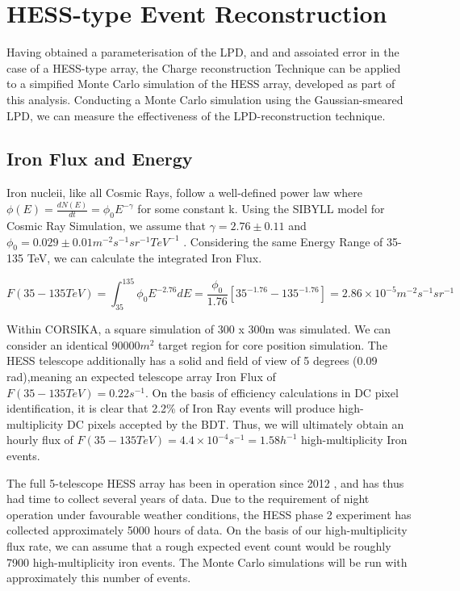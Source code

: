 \documentclass{article}
\begin{document}
\section{HESS-type Event Reconstruction}
Having obtained a parameterisation of the LPD, and and assoiated error in the case of a HESS-type array, the Charge reconstruction Technique can be applied to a simpified Monte Carlo simulation of the HESS array, developed as part of this analysis. Conducting a Monte Carlo simulation using the Gaussian-smeared LPD, we can measure the effectiveness of the LPD-reconstruction technique.

\subsection{Iron Flux and Energy}
Iron nucleii, like all Cosmic Rays, follow a well-defined power law where $\phi(E) = \frac{dN(E)}{dt} = \phi_{0} E^{-\gamma} $ for some constant k. Using the SIBYLL model for Cosmic Ray Simulation, we assume that $ \gamma = 2.76 \pm 0.11 $ and $\phi_{0}=0.029 \pm 0.01 m^{-2} s^{-1} sr^{-1} TeV ^{-1}$ \cite{hess07}. Considering the same Energy Range of 35-135 TeV, we can calculate the integrated Iron Flux. 

\[ F(35-135TeV) = \int_{35}^{135} \phi_{0} E^{-2.76} dE = \frac{\phi_{0}}{1.76}[35^{-1.76} - 135^{-1.76}] = 2.86 \times 10^{-5} m^{-2} s^{-1} sr^{-1}\]

Within CORSIKA, a square simulation of 300 x 300m was simulated. We can consider an identical $90000 m^{2}$ target region for core position simulation. The HESS telescope additionally has a solid and field of view of 5 degrees (0.09 rad),meaning an expected telescope array Iron Flux of $F(35-135TeV) = 0.22 s^{-1}$. On the basis of efficiency calculations in DC pixel identification, it is clear that 2.2\% of Iron Ray events will produce high-multiplicity DC pixels accepted by the BDT. Thus, we will ultimately obtain an hourly flux of $F(35-135TeV) = 4.4 \times 10^{-4} s^{-1} = 1.58 h^{-1}$ high-multiplicity Iron events. 

The full 5-telescope HESS array has been in operation since 2012 \cite{hessCT5}, and has thus had time to collect several years of data. Due to the requirement of night operation under favourable weather conditions, the HESS phase 2 experiment has collected approximately 5000 hours of data. On the basis of our high-multiplicity flux rate, we can assume that a rough expected event count would be roughly 7900 high-multiplicity iron events. The Monte Carlo simulations will be run with approximately this number of events.
\end{document}
